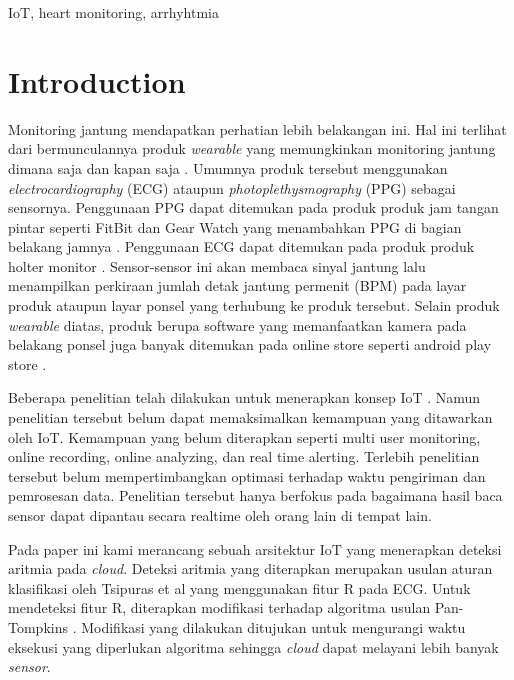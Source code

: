 \documentclass[]{indojc}
\begin{document}
\begin{keywords}
IoT, heart monitoring, arrhyhtmia
\end{keywords}

\section{Introduction}
Monitoring jantung mendapatkan perhatian lebih belakangan ini. Hal ini terlihat dari bermunculannya produk \textit{wearable} yang memungkinkan monitoring jantung dimana saja dan kapan saja \cite{online:fitbit, online:samsung_gear, online:endo_holter}. Umumnya produk tersebut menggunakan \textit{electrocardiography} (ECG) ataupun \textit{photoplethysmography} (PPG) sebagai sensornya. Penggunaan PPG dapat ditemukan pada produk produk jam tangan pintar seperti FitBit dan Gear Watch yang menambahkan PPG di bagian belakang jamnya \cite{online:fitbit, online:samsung_gear}. Penggunaan ECG dapat ditemukan pada produk produk holter monitor \cite{online:endo_holter}. Sensor-sensor ini akan membaca sinyal jantung lalu menampilkan perkiraan jumlah detak jantung permenit (BPM) pada layar produk ataupun layar ponsel yang terhubung ke produk tersebut. Selain produk \textit{wearable} diatas, produk berupa software yang memanfaatkan kamera pada belakang ponsel juga banyak ditemukan pada online store seperti android play store \cite{playstore_heart}.

Beberapa penelitian telah dilakukan untuk menerapkan konsep IoT \cite{daniel_barataa, paola_pierleoni, vasu_jindal, mamidi}. Namun penelitian tersebut belum dapat memaksimalkan kemampuan yang ditawarkan oleh IoT. Kemampuan yang belum diterapkan seperti multi user monitoring, online recording, online analyzing, dan real time alerting. Terlebih penelitian tersebut belum mempertimbangkan optimasi terhadap waktu pengiriman dan pemrosesan data. Penelitian tersebut hanya berfokus pada bagaimana hasil baca sensor dapat dipantau secara realtime oleh orang lain di tempat lain.

Pada paper ini kami merancang sebuah arsitektur IoT yang menerapkan deteksi aritmia pada \textit{cloud}. Deteksi aritmia yang diterapkan merupakan usulan aturan klasifikasi oleh Tsipuras et al \cite{tsipouras} yang menggunakan fitur R pada ECG. Untuk mendeteksi fitur R, diterapkan modifikasi terhadap algoritma usulan Pan-Tompkins \cite{pantom}. Modifikasi yang dilakukan ditujukan untuk mengurangi waktu eksekusi yang diperlukan algoritma sehingga \textit{cloud} dapat melayani lebih banyak \textit{sensor}.
\end{document}
